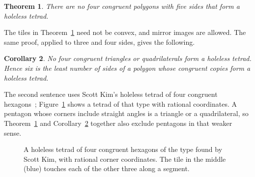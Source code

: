 \documentclass[11pt]{article}
\newtheorem{theorem}{Theorem}
\newtheorem{corollary}[theorem]{Corollary}
\theoremstyle{definition}
\theoremstyle{remark}
\begin{document}
\begin{theorem}\label{thm:main}
There are no four congruent polygons with five sides that form a holeless
tetrad.
\end{theorem}

The tiles in Theorem~\ref{thm:main} need not be convex, and mirror images
are allowed. The same proof, applied to three and four sides, gives the
following.

\begin{corollary}\label{cor:six}
No four congruent triangles or quadrilaterals form a holeless tetrad. Hence
six is the least number of sides of a polygon whose congruent copies form a
holeless tetrad.
\end{corollary}

The second sentence uses Scott Kim's holeless tetrad of four congruent
hexagons~\cite{wiki}; Figure~\ref{fig:hex} shows a tetrad of that type with
rational coordinates. A pentagon whose corners include straight angles is a
triangle or a quadrilateral, so Theorem~\ref{thm:main} and
Corollary~\ref{cor:six} together also exclude pentagons in that weaker sense.

\begin{figure}[t]
\centering
{}
\caption{A holeless tetrad of four congruent hexagons of the type found by
Scott Kim, with rational corner coordinates. The tile in the middle (blue)
touches each of the other three along a segment.}\label{fig:hex}
\end{figure}
\end{document}
